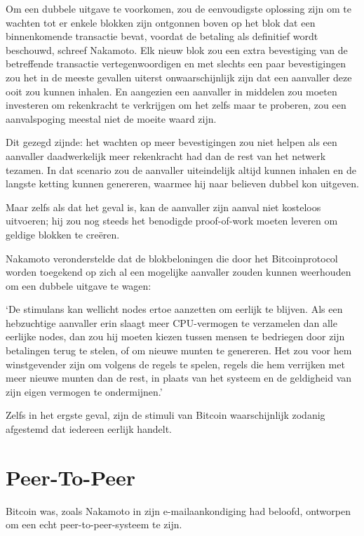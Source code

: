 \documentclass[
  a5paper,
  smalldemyvopaper,11pt,twoside,onecolumn,openright,extrafontsizes,
hidelinks]{memoir}
\renewenvironment{quote}%
               {\list{}{\rightmargin=.3cm\leftmargin=.3cm}%
                \itshape \item[]}%
               {\endlist}
\begin{document}
Om een dubbele uitgave te voorkomen, zou de eenvoudigste oplossing zijn
om te wachten tot er enkele blokken zijn ontgonnen boven op het blok dat
een binnenkomende transactie bevat, voordat de betaling als definitief
wordt beschouwd, schreef Nakamoto. Elk nieuw blok zou een extra
bevestiging van de betreffende transactie vertegenwoordigen en met
slechts een paar bevestigingen zou het in de meeste gevallen uiterst
onwaarschijnlijk zijn dat een aanvaller deze ooit zou kunnen inhalen. En
aangezien een aanvaller in middelen zou moeten investeren om rekenkracht
te verkrijgen om het zelfs maar te proberen, zou een aanvalspoging
meestal niet de moeite waard zijn.

Dit gezegd zijnde: het wachten op meer bevestigingen zou niet helpen als
een aanvaller daadwerkelijk meer rekenkracht had dan de rest van het
netwerk tezamen. In dat scenario zou de aanvaller uiteindelijk altijd
kunnen inhalen en de langste ketting kunnen genereren, waarmee hij naar
believen dubbel kon uitgeven.

Maar zelfs als dat het geval is, kan de aanvaller zijn aanval niet
kosteloos uitvoeren; hij zou nog steeds het benodigde proof-of-work
moeten leveren om geldige blokken te creëren.

Nakamoto veronderstelde dat de blokbeloningen die door het
Bitcoinprotocol worden toegekend op zich al een mogelijke aanvaller
zouden kunnen weerhouden om een dubbele uitgave te wagen:

\begin{quote}
`De stimulans kan wellicht nodes ertoe aanzetten om eerlijk te blijven.
Als een hebzuchtige aanvaller erin slaagt meer CPU-vermogen te
verzamelen dan alle eerlijke nodes, dan zou hij moeten kiezen tussen
mensen te bedriegen door zijn betalingen terug te stelen, of om nieuwe
munten te genereren. Het zou voor hem winstgevender zijn om volgens de
regels te spelen, regels die hem verrijken met meer nieuwe munten dan de
rest, in plaats van het systeem en de geldigheid van zijn eigen vermogen
te ondermijnen.'
\end{quote}

Zelfs in het ergste geval, zijn de stimuli van Bitcoin waarschijnlijk
zodanig afgestemd dat iedereen eerlijk handelt.

\section{Peer-To-Peer}\label{peer-to-peer}

Bitcoin was, zoals Nakamoto in zijn e-mailaankondiging had beloofd,
ontworpen om een echt peer-to-peer-systeem te zijn.
\end{document}
